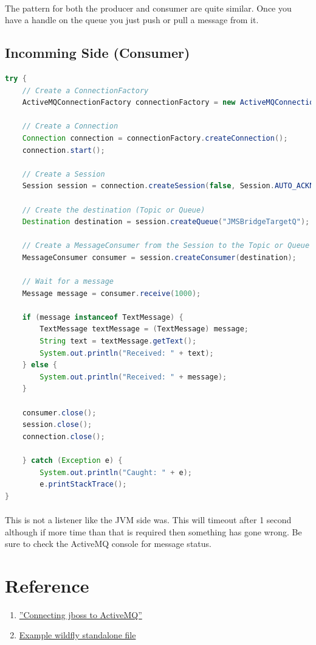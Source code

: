 \documentclass[
10pt, %
letterpaper, %
oneside, %
headinclude,footinclude, %
BCOR5mm, %
]{scrartcl}
\begin{document}
\paragraph{}
The pattern for both the producer and consumer are quite similar. Once you have a handle on the queue you just push or pull a message from it.

\subsection{\textbf{Incomming Side (Consumer)}}
\begin{lstlisting}[language=Java]
try {
	// Create a ConnectionFactory
	ActiveMQConnectionFactory connectionFactory = new ActiveMQConnectionFactory("tcp://opmq1.outsmartinc.com:61616");

	// Create a Connection
	Connection connection = connectionFactory.createConnection();
	connection.start();

	// Create a Session
	Session session = connection.createSession(false, Session.AUTO_ACKNOWLEDGE);

	// Create the destination (Topic or Queue)
	Destination destination = session.createQueue("JMSBridgeTargetQ");

	// Create a MessageConsumer from the Session to the Topic or Queue
	MessageConsumer consumer = session.createConsumer(destination);

	// Wait for a message
	Message message = consumer.receive(1000);

	if (message instanceof TextMessage) {
		TextMessage textMessage = (TextMessage) message;
		String text = textMessage.getText();
		System.out.println("Received: " + text);
	} else {
		System.out.println("Received: " + message);
	}

	consumer.close();	
	session.close();
	connection.close();
	
	} catch (Exception e) {
		System.out.println("Caught: " + e);
		e.printStackTrace();
}
\end{lstlisting}


\paragraph{}
This is not a listener like the JVM side was. This will timeout after 1 second although if more time than that is required then something has gone wrong. Be sure to check the ActiveMQ console for message status.



\section{Reference}


\begin{enumerate}
\item\href{http://blog.c2b2.co.uk/2014/01/connecting-jboss-wildfly-7-to-activemq.html}{''Connecting jboss to ActiveMQ''}
\item\href{file:standalone-full.xml}{Example wildfly standalone file}
\end{enumerate}
\end{document}
